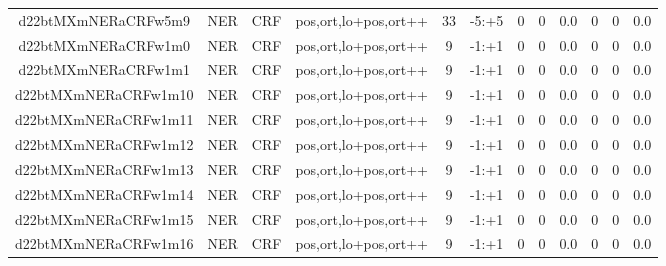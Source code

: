 \documentclass[a4paper]{article}
\begin{document}
\begin{landscape}
\begin{center}
\begin{tabular}{ |c|c|c|c|c|c|c|c|c|c|c|c|}
 
 	
 	\small{ d22btMXmNERaCRFw5m9 } & \small{ NER} & \small{  CRF }  & pos,ort,lo+pos,ort++  &  33 &  \small{  -5:+5 }  &  0 & 0 & 0.0  &  0 & 0 & 0.0 \\
 	

 
 	
 	\small{ d22btMXmNERaCRFw1m0 } & \small{ NER} & \small{  CRF }  & pos,ort,lo+pos,ort++  &  9 &  \small{  -1:+1 }  &  0 & 0 & 0.0  &  0 & 0 & 0.0 \\
 	

 
 	
 	\small{ d22btMXmNERaCRFw1m1 } & \small{ NER} & \small{  CRF }  & pos,ort,lo+pos,ort++  &  9 &  \small{  -1:+1 }  &  0 & 0 & 0.0  &  0 & 0 & 0.0 \\
 	

 
 	
 	\small{ d22btMXmNERaCRFw1m10 } & \small{ NER} & \small{  CRF }  & pos,ort,lo+pos,ort++  &  9 &  \small{  -1:+1 }  &  0 & 0 & 0.0  &  0 & 0 & 0.0 \\
 	

 
 	
 	\small{ d22btMXmNERaCRFw1m11 } & \small{ NER} & \small{  CRF }  & pos,ort,lo+pos,ort++  &  9 &  \small{  -1:+1 }  &  0 & 0 & 0.0  &  0 & 0 & 0.0 \\
 	

 
 	
 	\small{ d22btMXmNERaCRFw1m12 } & \small{ NER} & \small{  CRF }  & pos,ort,lo+pos,ort++  &  9 &  \small{  -1:+1 }  &  0 & 0 & 0.0  &  0 & 0 & 0.0 \\
 	

 
 	
 	\small{ d22btMXmNERaCRFw1m13 } & \small{ NER} & \small{  CRF }  & pos,ort,lo+pos,ort++  &  9 &  \small{  -1:+1 }  &  0 & 0 & 0.0  &  0 & 0 & 0.0 \\
 	

 
 	
 	\small{ d22btMXmNERaCRFw1m14 } & \small{ NER} & \small{  CRF }  & pos,ort,lo+pos,ort++  &  9 &  \small{  -1:+1 }  &  0 & 0 & 0.0  &  0 & 0 & 0.0 \\
 	

 
 	
 	\small{ d22btMXmNERaCRFw1m15 } & \small{ NER} & \small{  CRF }  & pos,ort,lo+pos,ort++  &  9 &  \small{  -1:+1 }  &  0 & 0 & 0.0  &  0 & 0 & 0.0 \\
 	

 
 	
 	\small{ d22btMXmNERaCRFw1m16 } & \small{ NER} & \small{  CRF }  & pos,ort,lo+pos,ort++  &  9 &  \small{  -1:+1 }  &  0 & 0 & 0.0  &  0 & 0 & 0.0 \\
 	

\end{tabular}
\end{center}
\end{landscape}
\end{document}
